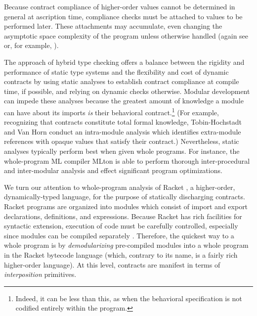 \documentclass{sigplanconf}
\begin{document}
Because contract compliance of higher-order values cannot be determined in general at ascription time, compliance checks must be attached to values to be performed later.
These attachments may accumulate, even changing the asymptotic space complexity of the program \cite{herman2010space} unless otherwise handled (again see \cite{herman2010space} or, for example, \cite{siek2010threesomes}).


The approach of hybrid type checking \cite{flanagan2006hybrid} offers a balance between the rigidity and performance of static type systems and the flexibility and cost of dynamic contracts by using static analyses to establish contract compliance at compile time, if possible, and relying on dynamic checks otherwise.
Modular development can impede these analyses because the greatest amount of knowledge a module can have about its imports \emph{is} their behavioral contract.\footnote{Indeed, it can be less than this, as when the behavioral specification is not codified entirely within the program.}
(For example, recognizing that contracts constitute total formal knowledge, Tobin-Hochstadt and Van Horn \cite{tobin2012higher} conduct an intra-module analysis which identifies extra-module references with opaque values that satisfy their contract.)
Nevertheless, static analyses typically perform best when given whole programs.
For instance, the whole-program ML compiler MLton \cite{weeks2006whole} is able to perform thorough inter-procedural and inter-modular analysis and effect significant program optimizations.

We turn our attention to whole-program analysis of Racket \cite{plt-tr1}, a higher-order, dynamically-typed language, for the purpose of statically discharging contracts.
Racket programs are organized into modules which consist of import and export declarations, definitions, and expressions.
Because Racket has rich facilities for syntactic extension, execution of code must be carefully controlled, especially since modules can be compiled separately \cite{flatt2002composable}.
Therefore, the quickest way to a whole program is by \emph{demodularizing} pre-compiled modules into a whole program in the Racket bytecode language (which, contrary to its name, is a fairly rich higher-order language).
At this level, contracts are manifest in terms of \emph{interposition} primitives.
\end{document}
